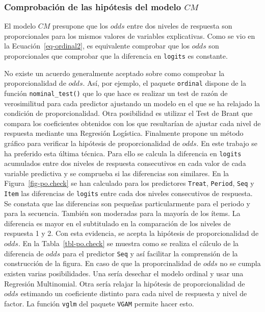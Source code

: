 \documentclass[
  12pt,
  a4paper,
  extrafontsizes,
  onecolumn,
  openright,
  table]{memoir}
\begin{document}
\hypertarget{comprobaciuxf3n-de-las-hipuxf3tesis-del-modelo-cm}{%
\subsubsection{\texorpdfstring{Comprobación de las hipótesis del modelo
\(CM\)}{Comprobación de las hipótesis del modelo CM}}\label{comprobaciuxf3n-de-las-hipuxf3tesis-del-modelo-cm}}

El modelo \(CM\) presupone que los \(odds\) entre dos niveles de
respuesta son proporcionales para los mismos valores de variables
explicativas. Como se vio en la Ecuación~\ref{eq-ordinal2}, es
equivalente comprobar que los \(odds\) son proporcionales que comprobar
que la diferencia en \texttt{logits} es constante.

No existe un acuerdo generalmente aceptado sobre como comprobar la
proporcionalidad de \(odds\). Así, por ejemplo, el paquete
\texttt{ordinal} \autocite[ver][]{ordinalR} dispone de la función
\texttt{nominal\_test()} que lo que hace es realizar un test de razón de
verosimilitud para cada predictor ajustando un modelo en el que se ha
relajado la condición de proporcionalidad. Otra posibilidad es utilizar
el Test de Brant \autocite[ver][]{brant1990} que compara los
coeficientes obtenidos con los que resultarían de ajustar cada nivel de
respuesta mediante una Regresión Logística. Finalmente \textcite[ver
pp.~315-316]{harrell2015} propone un método gráfico para verificar la
hipótesis de proporcionalidad de \(odds\). En este trabajo se ha
preferido esta última técnica. Para ello se calcula la diferencia en
\texttt{logits} acumulados entre dos niveles de respuesta consecutivos
en cada valor de cada variable predictiva y se comprueba si las
diferencias son similares. En la Figura~\ref{fig-po.check} se han
calculado para los predictores \texttt{Treat}, \texttt{Period},
\texttt{Seq} y \texttt{Item} las diferencias de \texttt{logits} entre
cada dos niveles consecutivos de respuesta. Se constata que las
diferencias son pequeñas particularmente para el periodo y para la
secuencia. También son moderadas para la mayoría de los ítems. La
diferencia es mayor en el subtitulado en la comparación de los niveles
de respuesta 1 y 2. Con esta evidencia, se acepta la hipótesis de
proporcionalidad de \(odds\). En la Tabla~\ref{tbl-po.check} se muestra
como se realiza el cálculo de la diferencia de \(odds\) para el
predictor \texttt{Seq} y así facilitar la comprensión de la construcción
de la figura. En caso de que la proporcinalidad de \(odds\) no se cumpla
existen varias posibilidades. Una sería desechar el modelo ordinal y
usar una Regresión Multinomial. Otra sería relajar la hipótesis de
proporcionalidad de \(odds\) estimando un coeficiente distinto para cada
nivel de respuesta y nivel de factor. La función \texttt{vglm} del
paquete \texttt{VGAM} \autocite[ver][]{VGAMR} permite hacer esto.
\end{document}
